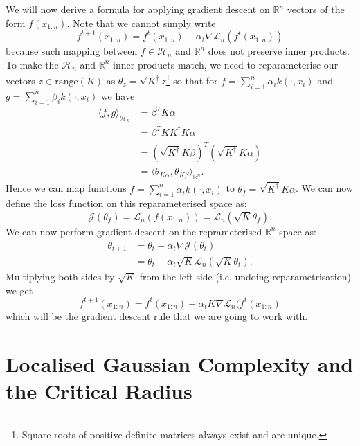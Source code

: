 We will now derive a formula for applying gradient descent on $\mathbb{R}^{n}$ vectors
of the form $f(x_{1:n})$.
Note that we cannot simply write
$$
f^{t+1}(x_{1:n}) = f^{t}(x_{1:n}) - \alpha_{t} \nabla \mathcal{L}_{n}(f^{t}(x_{1:n}))
$$
because such mapping between $f \in \mathcal{H}_{n}$ and $\mathbb{R}^{n}$ does not
preserve inner products.
To make the $\mathcal{H}_{n}$ and $\mathbb{R}^{n}$ inner products match,
we need to reparameterise our vectors $z \in \text{range}(K)$ as
$\theta_{z} = \sqrt{K^{\dagger}}z$\footnote{
Square roots of positive definite matrices always exist and are unique.
}
so that for $f = \sum_{i=1}^{n} \alpha_{i}k(\cdot, x_{i})$ and  $g = \sum_{i=1}^{n} \beta_{i}k(\cdot, x_{i})$
we have
\begin{align*}
\langle f, g \rangle_{\mathcal{H}_{n}} &= \beta^{T} K \alpha \\
                                         &= \beta^{T} K K^{\dagger} K \alpha \\
                                         &= (\sqrt{K^{\dagger}} K\beta)^{T} (\sqrt{K^{\dagger}} K \alpha) \\
                                         &= \langle \theta_{K\alpha}, \theta_{K\beta} \rangle_{\mathbb{R}^{n}}.
\end{align*}
Hence we can map functions $f = \sum_{i=1}^{n} \alpha_{i}k(\cdot, x_{i})$ to
$\theta_{f} = \sqrt{K^{\dagger}}K\alpha$.
We can now define the loss function on this reparameterised space as:
$$
\mathcal{J}(\theta_f) = \mathcal{L}_{n}(f(x_{1:n})) = \mathcal{L}_{n}(\sqrt{K}\theta_f).
$$
We can now perform gradient descent on the reprameterised $\mathbb{R}^{n}$ space
as:
\begin{align*}
  \theta_{t+1} &= \theta_{t} - \alpha_{t} \nabla \mathcal{J}(\theta_t) \\
               &= \theta_{t} - \alpha_{t} \sqrt{K} \mathcal{L}_{n}(\sqrt{K}\theta_t).
\end{align*}
Multiplying both sides by $\sqrt{K}$ from the left side (i.e. undoing reparametrisation)
we get
\begin{equation}
  f^{t+1}(x_{1:n}) = f^{t}(x_{1:n}) - \alpha_{t}K\nabla\mathcal{L}_{n}(f^{t}(x_{1:n})
\end{equation}
which will be the gradient descent rule that we are going to work with.

\section{Localised Gaussian Complexity and the Critical Radius}

